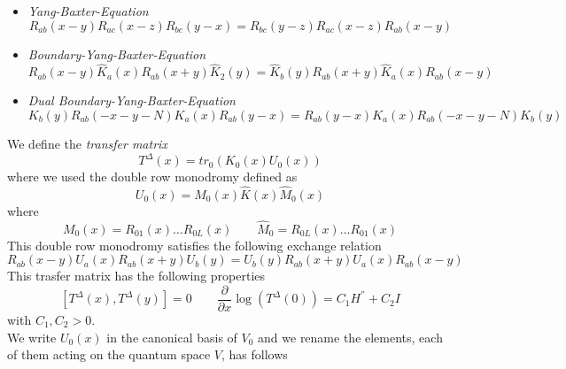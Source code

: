 \documentclass[10pt]{article}
\numberwithin{equation}{section}
\numberwithin{equation}{subsection}
\begin{document}
\begin{itemize}
	\item \textit{Yang-Baxter-Equation}
	\begin{equation}
		R_{ab}(x-y)R_{ac}(x-z)R_{bc}(y-x)=R_{bc}(y-z)R_{ac}(x-z)R_{ab}(x-y)
	\end{equation}
	\item \textit{Boundary-Yang-Baxter-Equation}
	\begin{equation}
		R_{ab}(x-y)\widehat{K}_{a}(x)R_{ab}(x+y)\widehat{K}_{2}(y)=\widehat{K}_{b}(y)R_{ab}(x+y)\widehat{K}_{a}(x)R_{ab}(x-y)
	\end{equation}
	\item \textit{Dual Boundary-Yang-Baxter-Equation}
	\begin{equation}
		K_{b}(y) R_{ab}(-x-y-N) K_{a}(x)R_{ab}(y-x)=R_{ab}(y-x)K_{a}(x)R_{ab}(-x-y-N)K_{b}(y)
	\end{equation}
\end{itemize}
We define the \textit{transfer matrix}
\begin{equation}
	T^{\Delta}(x)=tr_{0}\left(K_{0}(x)U_{0}(x)\right)
\end{equation}
where we used the double row monodromy defined as
\begin{equation}
	U_{0}(x)=M_{0}(x)\widehat{K}(x)\widehat{M}_{0}(x)
\end{equation}
where 
\begin{equation}
	M_{0}(x)=R_{01}(x)\ldots R_{0L}(x)\qquad \widehat{M}_{0}=R_{0L}(x)\ldots R_{01}(x)
\end{equation}
This double row monodromy satisfies the following exchange relation
\begin{equation}\label{RURU}
	R_{ab}(x-y)U_{a}(x)R_{ab}(x+y)U_{b}(y)=U_{b}(y)R_{ab}(x+y)U_{a}(x)R_{ab}(x-y)
\end{equation}
This trasfer matrix has the following properties
\begin{equation}
	\left[T^{\Delta}(x),T^{\Delta}(y)\right]=0\qquad \frac{\partial}{\partial x}\log (T^{\Delta}(0))=C_{1}H^{''}+C_{2}I
\end{equation}
with $C_{1},C_{2}>0$. \\
We write $U_{0}(x)$ in the canonical basis of $V_{0}$ and we rename the elements, each of them acting on the quantum space $V$, has follows

\end{document}
